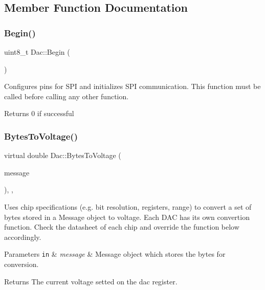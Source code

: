 \subsection{Member Function Documentation}
\mbox{\label{classDac_a342bb811b205d50baacb3211e89ea062}} 
\subsubsection{\texorpdfstring{Begin()}{Begin()}}
{\footnotesize\ttfamily uint8\+\_\+t Dac\+::\+Begin (\begin{DoxyParamCaption}\item[{void}]{ }\end{DoxyParamCaption})}

Configures pins for S\+PI and initializes S\+PI communication. This function must be called before calling any other function. \begin{DoxyReturn}{Returns}
0 if successful 
\end{DoxyReturn}
\mbox{\label{classDac_a2dc7bd90fddf1e38af8f18a0191ce840}} 
\subsubsection{\texorpdfstring{Bytes\+To\+Voltage()}{BytesToVoltage()}}
{\footnotesize\ttfamily virtual double Dac\+::\+Bytes\+To\+Voltage (\begin{DoxyParamCaption}\item[{\mbox{\hyperlink{structspi__utils_1_1Message}{spi\+\_\+utils\+::\+Message}}}]{message }\end{DoxyParamCaption})\hspace{0.3cm}{\ttfamily [inline]}, {\ttfamily [protected]}, {\ttfamily [virtual]}}

Uses chip specifications (e.\+g. bit resolution, registers, range) to convert a set of bytes stored in a Message object to voltage. Each D\+AC has its own convertion function. Check the datasheet of each chip and override the function below accordingly. 
\begin{DoxyParams}[1]{Parameters}
\mbox{\tt in}  & {\em message} & Message object which stores the bytes for conversion. \\
\hline
\end{DoxyParams}
\begin{DoxyReturn}{Returns}
The current voltage setted on the dac register. 
\end{DoxyReturn}


